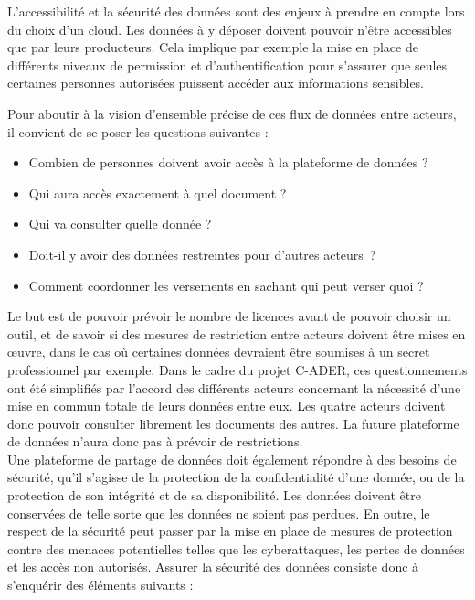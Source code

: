 L'accessibilité et la sécurité des données sont des enjeux à prendre en compte lors du choix d'un cloud. Les données à y déposer doivent pouvoir n’être accessibles que par leurs producteurs. Cela implique par exemple la mise en place de différents niveaux de permission et d'authentification pour s'assurer que seules certaines personnes autorisées puissent accéder aux informations sensibles.

Pour aboutir à la vision d’ensemble précise de ces flux de données entre acteurs, il convient de se poser les questions suivantes :\\
\begin{itemize}
	\item Combien de personnes doivent avoir accès à la plateforme de données ?
	\item Qui aura accès exactement à quel document ? 
	\item Qui va consulter quelle donnée ?
	\item Doit-il y avoir des données restreintes pour d’autres acteurs ?
	\item Comment coordonner les versements en sachant qui peut verser quoi ?
\end{itemize}

Le but est de pouvoir prévoir le nombre de licences avant de pouvoir choisir un outil, et de savoir si des mesures de restriction entre acteurs doivent être mises en œuvre, dans le cas où certaines données devraient être soumises à un secret professionnel par exemple. Dans le cadre du projet C-ADER, ces questionnements ont été simplifiés par l’accord des différents acteurs concernant la nécessité d’une mise en commun totale de leurs données entre eux. Les quatre acteurs doivent donc pouvoir consulter librement les documents des autres. La future plateforme de données n’aura donc pas à prévoir de restrictions.\\

Une plateforme de partage de données doit également répondre à des besoins de sécurité, qu’il s’agisse de la protection de la confidentialité d’une donnée, ou de la protection de son intégrité et de sa disponibilité. Les données doivent  être conservées de telle sorte que les données ne soient pas perdues. En outre, le respect de la sécurité peut passer par la mise en place de mesures de protection contre des menaces potentielles telles que les cyberattaques, les pertes de données et les accès non autorisés. Assurer la sécurité des données consiste donc à s'enquérir des éléments suivants : \\

